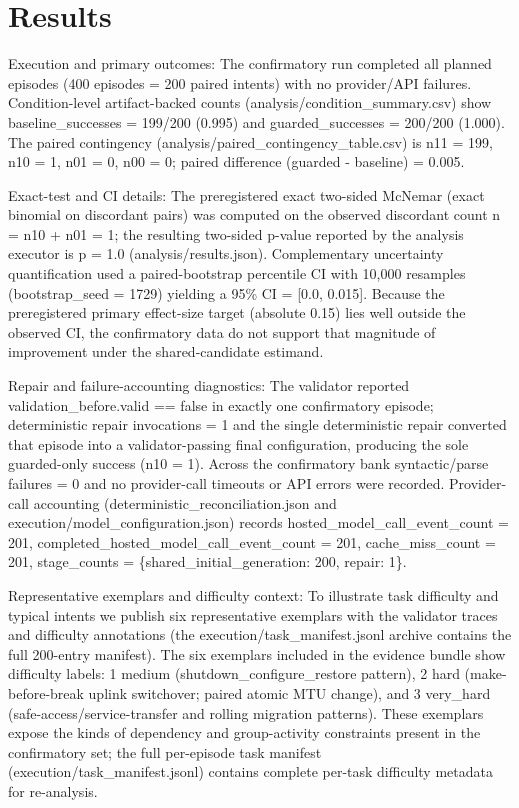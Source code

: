 \documentclass[conference]{IEEEtran}
\begin{document}
\section{Results}
Execution and primary outcomes: The confirmatory run completed all planned episodes (400 episodes = 200 paired intents) with no provider/API failures. Condition-level artifact-backed counts (analysis/condition\_summary.csv) show baseline\_successes = 199/200 (0.995) and guarded\_successes = 200/200 (1.000). The paired contingency (analysis/paired\_contingency\_table.csv) is n11 = 199, n10 = 1, n01 = 0, n00 = 0; paired difference (guarded - baseline) = 0.005.

Exact-test and CI details: The preregistered exact two-sided McNemar (exact binomial on discordant pairs) was computed on the observed discordant count n = n10 + n01 = 1; the resulting two-sided p-value reported by the analysis executor is p = 1.0 (analysis/results.json). Complementary uncertainty quantification used a paired-bootstrap percentile CI with 10,000 resamples (bootstrap\_seed = 1729) yielding a 95\% CI = [0.0, 0.015]. Because the preregistered primary effect-size target (absolute 0.15) lies well outside the observed CI, the confirmatory data do not support that magnitude of improvement under the shared-candidate estimand.

Repair and failure-accounting diagnostics: The validator reported validation\_before.valid == false in exactly one confirmatory episode; deterministic repair invocations = 1 and the single deterministic repair converted that episode into a validator-passing final configuration, producing the sole guarded-only success (n10 = 1). Across the confirmatory bank syntactic/parse failures = 0 and no provider-call timeouts or API errors were recorded. Provider-call accounting (deterministic\_reconciliation.json and execution/model\_configuration.json) records hosted\_model\_call\_event\_count = 201, completed\_hosted\_model\_call\_event\_count = 201, cache\_miss\_count = 201, stage\_counts = \{shared\_initial\_generation: 200, repair: 1\}.

Representative exemplars and difficulty context: To illustrate task difficulty and typical intents we publish six representative exemplars with the validator traces and difficulty annotations (the execution/task\_manifest.jsonl archive contains the full 200-entry manifest). The six exemplars included in the evidence bundle show difficulty labels: 1 medium (shutdown\_configure\_restore pattern), 2 hard (make-before-break uplink switchover; paired atomic MTU change), and 3 very\_hard (safe-access/service-transfer and rolling migration patterns). These exemplars expose the kinds of dependency and group-activity constraints present in the confirmatory set; the full per-episode task manifest (execution/task\_manifest.jsonl) contains complete per-task difficulty metadata for re-analysis.
\end{document}
